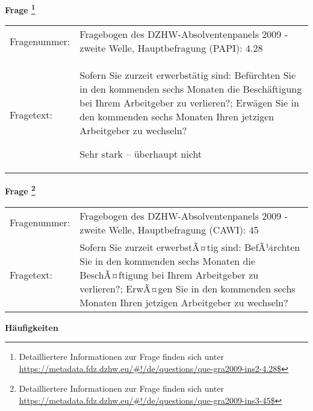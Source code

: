 				\vspace*{0.5cm}
                \noindent\textbf{Frage
	                \footnote{Detailliertere Informationen zur Frage finden sich unter
		              \url{https://metadata.fdz.dzhw.eu/\#!/de/questions/que-gra2009-ins2-4.28$}}}\\
				\begin{tabularx}{\hsize}{@{}lX}
					Fragenummer: &
					  Fragebogen des DZHW-Absolventenpanels 2009 - zweite Welle, Hauptbefragung (PAPI):
					  4.28
 \\
					Fragetext: & Sofern Sie zurzeit erwerbstätig sind: Befürchten Sie in den kommenden sechs Monaten die Beschäftigung bei Ihrem Arbeitgeber zu verlieren?; Erwägen Sie in den kommenden sechs Monaten Ihren jetzigen Arbeitgeber zu wechseln?\par  Sehr stark -- überhaupt nicht \\
				\end{tabularx}
				\vspace*{0.5cm}
                \noindent\textbf{Frage
	                \footnote{Detailliertere Informationen zur Frage finden sich unter
		              \url{https://metadata.fdz.dzhw.eu/\#!/de/questions/que-gra2009-ins3-45$}}}\\
				\begin{tabularx}{\hsize}{@{}lX}
					Fragenummer: &
					  Fragebogen des DZHW-Absolventenpanels 2009 - zweite Welle, Hauptbefragung (CAWI):
					  45
 \\
					Fragetext: & Sofern Sie zurzeit erwerbstÃ¤tig sind: BefÃ¼rchten Sie in den kommenden sechs Monaten die BeschÃ¤ftigung bei Ihrem Arbeitgeber zu verlieren?; ErwÃ¤gen Sie in den kommenden sechs Monaten Ihren jetzigen Arbeitgeber zu wechseln? \\
				\end{tabularx}





        		\vspace*{0.5cm}
                \noindent\textbf{Häufigkeiten}

